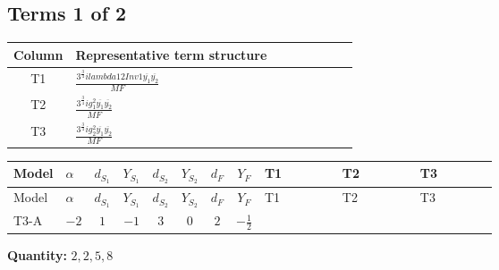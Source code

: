 \documentclass[8pt]{article}
\begin{document}
\begin{landscape}
\subsection*{Terms 1 of 2}
\begin{center}
\begin{tabular}{@{}c >{\raggedright\arraybackslash}p{0.82\linewidth}@{}}
\toprule
Column & Representative term structure \\
\midrule
T1 & \(\displaystyle \frac{3^{\frac{3}{4}} i lambda12Inv1 \overline{y_{1}} \overline{y_{2}}}{MF}\) \\
\midrule
T2 & \(\displaystyle \frac{3^{\frac{3}{4}} i g_{1}^{2} \overline{y_{1}} \overline{y_{2}}}{MF}\) \\
\midrule
T3 & \(\displaystyle \frac{3^{\frac{3}{4}} i g_{2}^{2} \overline{y_{1}} \overline{y_{2}}}{MF}\) \\
\midrule
\bottomrule
\end{tabular}
\end{center}
\smallskip
\tiny
\begin{longtable}{@{}llcccccc >{\raggedright\arraybackslash}p{0.21\linewidth} >{\raggedright\arraybackslash}p{0.21\linewidth} >{\raggedright\arraybackslash}p{0.21\linewidth}@{}}
\toprule
Model & $\alpha$ & $d_{S_1}$ & $Y_{S_1}$ & $d_{S_2}$ & $Y_{S_2}$ & $d_F$ & $Y_F$ & T1 & T2 & T3 \\
\midrule
\endfirsthead
\toprule
Model & $\alpha$ & $d_{S_1}$ & $Y_{S_1}$ & $d_{S_2}$ & $Y_{S_2}$ & $d_F$ & $Y_F$ & T1 & T2 & T3 \\
\midrule
\endhead
T3-A & $-2$ & $1$ & $-1$ & $3$ & $0$ & $2$ & $-\frac{1}{2}$ & \scriptsize\adjustbox{max width=\linewidth}{$\begin{gathered} \frac{3^{\frac{3}{4}} i lambda12Inv1 \overline{y_{1}} \overline{y_{2}}}{6 MF}\end{gathered}$} & \scriptsize\adjustbox{max width=\linewidth}{$\begin{gathered} \frac{3^{\frac{3}{4}} i g_{1}^{2} \overline{y_{1}} \overline{y_{2}}}{8 MF}\end{gathered}$} & \scriptsize\adjustbox{max width=\linewidth}{$\begin{gathered} \frac{17 \cdot 3^{\frac{3}{4}} i g_{2}^{2} \overline{y_{1}} \overline{y_{2}}}{24 MF}\end{gathered}$} \\
\midrule
\bottomrule
\end{longtable}
\clearpage
\noindent\textbf{Quantity: }$\mathrm{2,2,5,8}$\par\smallskip

\end{landscape}
\end{document}
